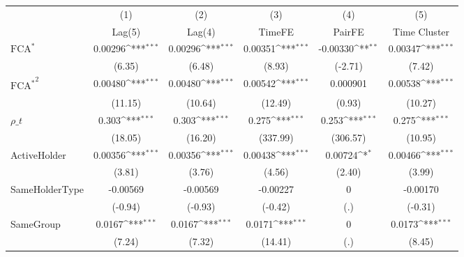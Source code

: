 {
\def\sym#1{\ifmmode^{#1}\else\(^{#1}\)\fi}
\begin{tabular}{l*{5}{c}}
\hline\hline
                    &\multicolumn{1}{c}{(1)}&\multicolumn{1}{c}{(2)}&\multicolumn{1}{c}{(3)}&\multicolumn{1}{c}{(4)}&\multicolumn{1}{c}{(5)}\\
                    &\multicolumn{1}{c}{Lag(5)}&\multicolumn{1}{c}{Lag(4)}&\multicolumn{1}{c}{TimeFE}&\multicolumn{1}{c}{PairFE}&\multicolumn{1}{c}{Time Cluster}\\
\hline
$ \text{FCA}^* $    &     0.00296\sym{***}&     0.00296\sym{***}&     0.00351\sym{***}&    -0.00330\sym{**} &     0.00347\sym{***}\\
                    &      (6.35)         &      (6.48)         &      (8.93)         &     (-2.71)         &      (7.42)         \\
[1em]
 $ { \text{FCA} ^ * } ^2 $&     0.00480\sym{***}&     0.00480\sym{***}&     0.00542\sym{***}&    0.000901         &     0.00538\sym{***}\\
                    &     (11.15)         &     (10.64)         &     (12.49)         &      (0.93)         &     (10.27)         \\
[1em]
$ \rho\_t $          &       0.303\sym{***}&       0.303\sym{***}&       0.275\sym{***}&       0.253\sym{***}&       0.275\sym{***}\\
                    &     (18.05)         &     (16.20)         &    (337.99)         &    (306.57)         &     (10.95)         \\
[1em]
ActiveHolder        &     0.00356\sym{***}&     0.00356\sym{***}&     0.00438\sym{***}&     0.00724\sym{*}  &     0.00466\sym{***}\\
                    &      (3.81)         &      (3.76)         &      (4.56)         &      (2.40)         &      (3.99)         \\
[1em]
SameHolderType      &    -0.00569         &    -0.00569         &    -0.00227         &           0         &    -0.00170         \\
                    &     (-0.94)         &     (-0.93)         &     (-0.42)         &         (.)         &     (-0.31)         \\
[1em]
SameGroup           &      0.0167\sym{***}&      0.0167\sym{***}&      0.0171\sym{***}&           0         &      0.0173\sym{***}\\
                    &      (7.24)         &      (7.32)         &     (14.41)         &         (.)         &      (8.45)         \\

\end{tabular}}
